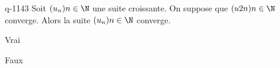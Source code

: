 \begin{truefalse}{q-1143}
Soit $(u_n){n\in\N}$ une suite croissante. On suppose que $(u{2n}){n\in\N}$ converge. Alors la suite $(u_n){n\in\N}$ converge.
\item* Vrai
\item Faux
\end{truefalse}

